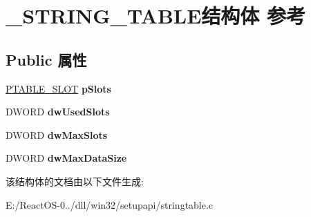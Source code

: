 \hypertarget{struct___s_t_r_i_n_g___t_a_b_l_e}{}\section{\+\_\+\+S\+T\+R\+I\+N\+G\+\_\+\+T\+A\+B\+L\+E结构体 参考}
\label{struct___s_t_r_i_n_g___t_a_b_l_e}
\subsection*{Public 属性}
\begin{DoxyCompactItemize}
\item 
\mbox{\label{struct___s_t_r_i_n_g___t_a_b_l_e_a6c701a786cd2442af08b63f9ccdb5d4a}} 
\hyperlink{struct___t_a_b_l_e___s_l_o_t}{P\+T\+A\+B\+L\+E\+\_\+\+S\+L\+OT} {\bfseries p\+Slots}
\item 
\mbox{\label{struct___s_t_r_i_n_g___t_a_b_l_e_a4e9d6c994c4f0154a39e1cbf7ecd558f}} 
D\+W\+O\+RD {\bfseries dw\+Used\+Slots}
\item 
\mbox{\label{struct___s_t_r_i_n_g___t_a_b_l_e_ad8061d6d5c80f4aa2e40c32b6de29ea1}} 
D\+W\+O\+RD {\bfseries dw\+Max\+Slots}
\item 
\mbox{\label{struct___s_t_r_i_n_g___t_a_b_l_e_a0b766fca51a6bd36f13198c3ada5bbfd}} 
D\+W\+O\+RD {\bfseries dw\+Max\+Data\+Size}
\end{DoxyCompactItemize}


该结构体的文档由以下文件生成\+:\begin{DoxyCompactItemize}
\item 
E\+:/\+React\+O\+S-\/0../dll/win32/setupapi/stringtable.\+c\end{DoxyCompactItemize}

